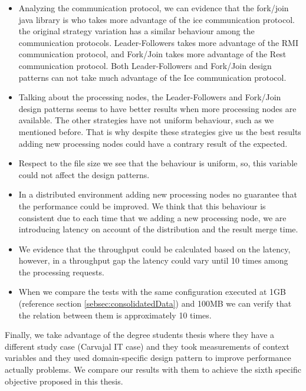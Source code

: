 \begin{itemize}
	\item  Analyzing the communication protocol, we can evidence that the fork/join java library is who takes more advantage of the ice communication protocol. the original strategy variation has a similar behaviour among the communication protocols. Leader-Followers takes more advantage of the RMI communication protocol, and Fork/Join takes more advantage of the Rest communication protocol. Both Leader-Followers and Fork/Join design patterns can not take much advantage of the Ice communication protocol.
	\item Talking about the processing nodes, the Leader-Followers and Fork/Join design patterns seems to have better results when more processing nodes are available. The other strategies have not uniform behaviour, such as we mentioned before. That is why despite these strategies give us the best results adding new processing nodes could have a contrary result of the expected.
	\item Respect to the file size we see that the behaviour is uniform, so, this variable could not affect the design patterns.
	\item In a distributed environment adding new processing nodes no guarantee that the performance could be improved. We think that this behaviour is consistent due to each time that we adding a new processing node, we are introducing latency on account of the distribution and the result merge time.
	\item  We evidence that the throughput could be calculated based on the latency, however, in a throughput gap the latency could vary until 10 times among the processing requests.
	\item When we compare the tests with the same configuration executed at 1GB (reference section \ref{sebsec:consolidatedData}) and 100MB we can verify that the relation between them is approximately 10 times.
\end{itemize}

Finally, we take advantage of the degree students thesis where they have a different study case (Carvajal IT case) and they took measurements of context variables and they used domain-specific design pattern to improve performance actually problems. We compare our results with them to achieve the sixth specific objective proposed in this thesis.
